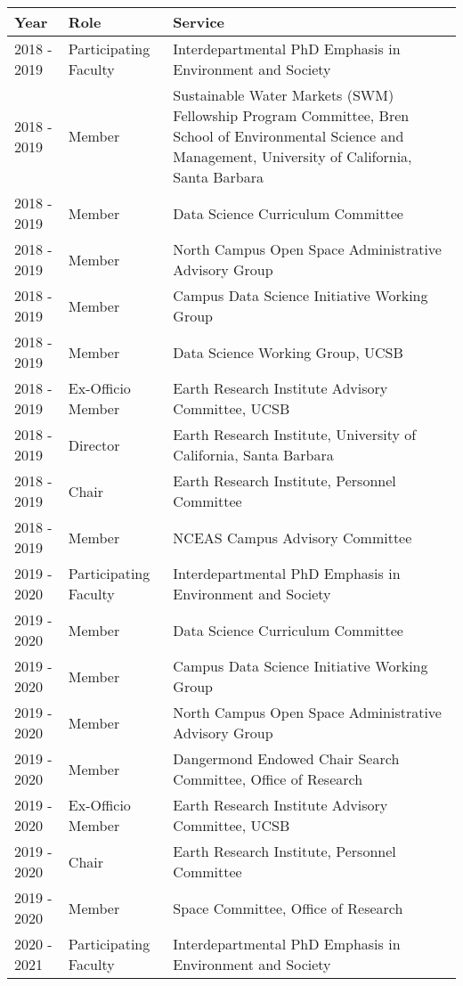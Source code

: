 
\begin{longtable}{llp{12cm}}
Year & Role & Service\\
\hline 
\endhead 
2018 - 2019 & Participating Faculty & Interdepartmental PhD Emphasis in Environment and Society \\
2018 - 2019 & Member  & Sustainable Water Markets (SWM) Fellowship Program Committee, Bren School of Environmental Science and Management, University of California, Santa Barbara \\
2018 - 2019 & Member & Data Science Curriculum Committee \\
2018 - 2019 & Member & North Campus Open Space Administrative Advisory Group \\
2018 - 2019 & Member & Campus Data Science Initiative Working Group \\
2018 - 2019 & Member & Data Science Working Group, UCSB \\
2018 - 2019 & Ex-Officio Member & Earth Research Institute Advisory Committee, UCSB \\
2018 - 2019 & Director & Earth Research Institute, University of California, Santa Barbara \\
2018 - 2019 & Chair & Earth Research Institute, Personnel Committee \\
2018 - 2019 & Member  & NCEAS Campus Advisory Committee  \\
2019 - 2020 & Participating Faculty & Interdepartmental PhD Emphasis in Environment and Society \\
2019 - 2020 & Member & Data Science Curriculum Committee \\
2019 - 2020 & Member & Campus Data Science Initiative Working Group \\
2019 - 2020 & Member & North Campus Open Space Administrative Advisory Group \\
2019 - 2020 & Member & Dangermond Endowed Chair Search Committee, Office of Research \\
2019 - 2020 & Ex-Officio Member & Earth Research Institute Advisory Committee, UCSB \\
2019 - 2020 & Chair & Earth Research Institute, Personnel Committee \\
2019 - 2020 & Member & Space Committee, Office of Research \\
2020 - 2021 & Participating Faculty & Interdepartmental PhD Emphasis in Environment and Society \\

\end{longtable}
